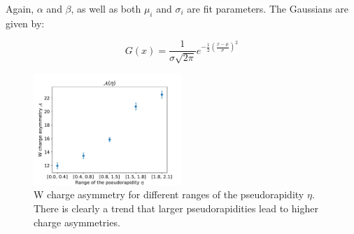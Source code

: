 \documentclass[%
 reprint,
 amsmath,amssymb,
 aps,
]{revtex4-2}
\begin{document}
Again, $\alpha$ and $\beta$, as well as both $\mu_i$ and $\sigma_i$ are fit parameters. The Gaussians are given by:

\begin{equation}\label{eq:gaus}
    G(x) = \frac{1}{\sigma \sqrt{2 \pi}} e^{-\frac{1}{2} \left( \frac{x - \mu}{\sigma} \right)^2}
\end{equation}

\begin{figure}
    \centering
    \includegraphics[width=0.5\textwidth]{Plots/part2/A_eta.pdf}
    \caption{W charge asymmetry for different ranges of the pseudorapidity $\eta$. There is clearly a trend that larger pseudorapidities lead to higher charge asymmetries.}
    \label{fig:A_eta}
\end{figure}
\end{document}
